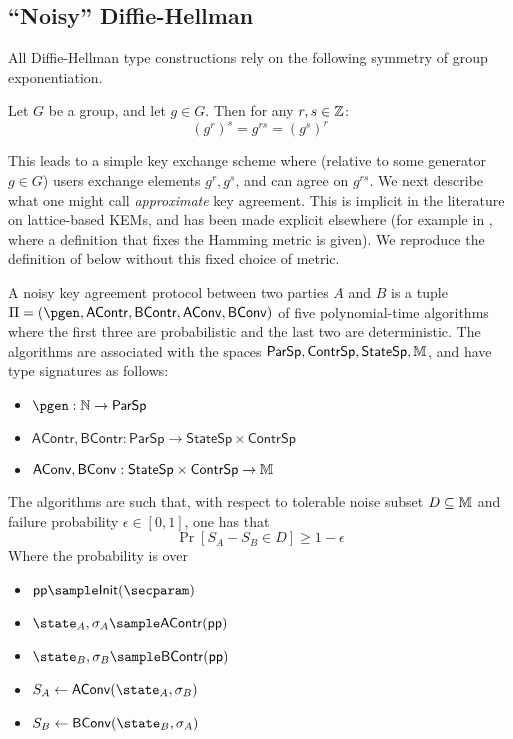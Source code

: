 \subsection{``Noisy'' Diffie-Hellman}
All Diffie-Hellman type constructions rely on the following symmetry of group exponentiation.
\begin{example}
	Let $G$ be a group, and let $g\in G$.
	Then for any $r, s\in\mathbb{Z}$:
	\begin{equation*}
	(g^r)^s = g^{rs} = (g^s)^r
	\end{equation*}
\end{example}
This leads to a simple key exchange scheme where (relative to some generator $g\in G$) users exchange elements $g^r, g^s$, and can agree on $g^{rs}$.
We next describe what one might call \emph{approximate} key agreement.
This is implicit in the literature on lattice-based KEMs, and has been made explicit elsewhere (for example in \cite{EPRINT:SzeReyPre18}, where a definition that fixes the Hamming metric is given).
We reproduce the definition of \cite{EPRINT:SzeReyPre18} below without this fixed choice of metric.

\begin{definition}
	A noisy key agreement protocol between two parties $A$ and $B$ is a tuple $\Pi = (\pgen, \mathsf{AContr}, \mathsf{BContr}, \mathsf{AConv}, \mathsf{BConv})$ of five polynomial-time algorithms where the first three are probabilistic and the last two are deterministic.
	The algorithms are associated with the spaces $\mathsf{ParSp}, \mathsf{ContrSp}, \mathsf{StateSp}, \mathbb{M}$, and have type signatures as follows:
	\begin{itemize}
		\item $\pgen : \Nset\to \mathsf{ParSp}$
		\item $\mathsf{AContr}, \mathsf{BContr} : \mathsf{ParSp} \to \mathsf{StateSp}\times \mathsf{ContrSp}$
		\item $\mathsf{AConv}, \mathsf{BConv} : \mathsf{StateSp}\times\mathsf{ContrSp} \to \mathbb{M}$
	\end{itemize}
	The algorithms are such that, with respect to tolerable noise subset $D\subseteq \mathbb{M}$ and failure probability $\epsilon\in[0,1]$, one has that
	\begin{equation*}
	\Pr\left[S_A-S_B \in D\right]\geq 1-\epsilon
	\end{equation*}
	Where the probability is over
	\begin{itemize}
		\item $\pubp \sample \mathsf{Init}(\secparam)$
		\item $\state_A, \sigma_A\sample \mathsf{AContr}(\pubp)$
		\item $\state_B, \sigma_B\sample \mathsf{BContr}(\pubp)$
		\item $S_A \gets \mathsf{AConv}(\state_A, \sigma_B)$
		\item $S_B\gets \mathsf{BConv}(\state_B, \sigma_A)$
	\end{itemize}
\end{definition}

